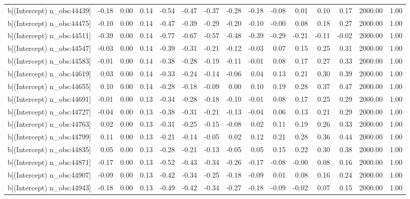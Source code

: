 \begin{table}[ht]
\begin{tabular}{rrrrrrrrrrrrrrr}
  b[(Intercept) n\_obs:44439] & -0.18 & 0.00 & 0.14 & -0.54 & -0.47 & -0.37 & -0.28 & -0.18 & -0.08 & 0.01 & 0.10 & 0.17 & 2000.00 & 1.00 \\ 
  b[(Intercept) n\_obs:44475] & -0.10 & 0.00 & 0.14 & -0.47 & -0.39 & -0.29 & -0.20 & -0.10 & -0.00 & 0.08 & 0.18 & 0.27 & 2000.00 & 1.00 \\ 
  b[(Intercept) n\_obs:44511] & -0.39 & 0.00 & 0.14 & -0.77 & -0.67 & -0.57 & -0.48 & -0.39 & -0.29 & -0.21 & -0.11 & -0.02 & 2000.00 & 1.00 \\ 
  b[(Intercept) n\_obs:44547] & -0.03 & 0.00 & 0.14 & -0.39 & -0.31 & -0.21 & -0.12 & -0.03 & 0.07 & 0.15 & 0.25 & 0.31 & 2000.00 & 1.00 \\ 
  b[(Intercept) n\_obs:44583] & -0.01 & 0.00 & 0.14 & -0.38 & -0.28 & -0.19 & -0.11 & -0.01 & 0.08 & 0.17 & 0.27 & 0.33 & 2000.00 & 1.00 \\ 
  b[(Intercept) n\_obs:44619] & 0.03 & 0.00 & 0.14 & -0.33 & -0.24 & -0.14 & -0.06 & 0.04 & 0.13 & 0.21 & 0.30 & 0.39 & 2000.00 & 1.00 \\ 
  b[(Intercept) n\_obs:44655] & 0.10 & 0.00 & 0.14 & -0.28 & -0.18 & -0.09 & 0.00 & 0.10 & 0.19 & 0.28 & 0.37 & 0.47 & 2000.00 & 1.00 \\ 
  b[(Intercept) n\_obs:44691] & -0.01 & 0.00 & 0.13 & -0.34 & -0.28 & -0.18 & -0.10 & -0.01 & 0.08 & 0.17 & 0.25 & 0.29 & 2000.00 & 1.00 \\ 
  b[(Intercept) n\_obs:44727] & -0.04 & 0.00 & 0.13 & -0.38 & -0.31 & -0.21 & -0.13 & -0.04 & 0.06 & 0.13 & 0.21 & 0.29 & 2000.00 & 1.00 \\ 
  b[(Intercept) n\_obs:44763] & 0.02 & 0.00 & 0.13 & -0.31 & -0.25 & -0.15 & -0.08 & 0.02 & 0.11 & 0.19 & 0.26 & 0.33 & 2000.00 & 1.00 \\ 
  b[(Intercept) n\_obs:44799] & 0.11 & 0.00 & 0.13 & -0.21 & -0.14 & -0.05 & 0.02 & 0.12 & 0.21 & 0.28 & 0.36 & 0.44 & 2000.00 & 1.00 \\ 
  b[(Intercept) n\_obs:44835] & 0.05 & 0.00 & 0.13 & -0.28 & -0.21 & -0.13 & -0.05 & 0.05 & 0.15 & 0.22 & 0.30 & 0.38 & 2000.00 & 1.00 \\ 
  b[(Intercept) n\_obs:44871] & -0.17 & 0.00 & 0.13 & -0.52 & -0.43 & -0.34 & -0.26 & -0.17 & -0.08 & -0.00 & 0.08 & 0.16 & 2000.00 & 1.00 \\ 
  b[(Intercept) n\_obs:44907] & -0.09 & 0.00 & 0.13 & -0.42 & -0.34 & -0.25 & -0.18 & -0.09 & 0.01 & 0.08 & 0.16 & 0.24 & 2000.00 & 1.00 \\ 
  b[(Intercept) n\_obs:44943] & -0.18 & 0.00 & 0.13 & -0.49 & -0.42 & -0.34 & -0.27 & -0.18 & -0.09 & -0.02 & 0.07 & 0.15 & 2000.00 & 1.00 \\ 

\end{tabular}
\end{table}

